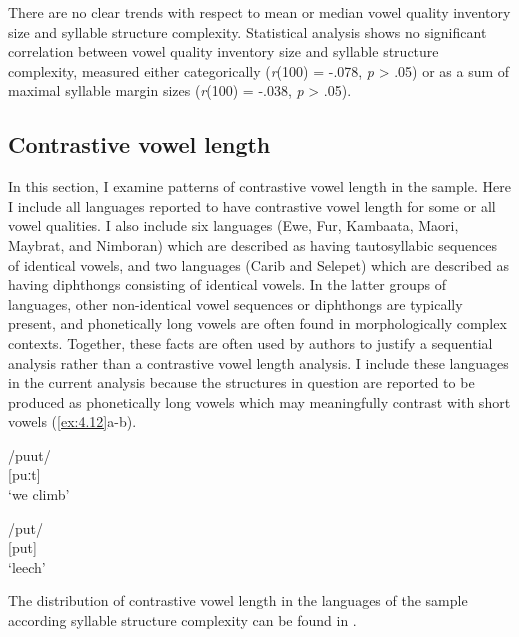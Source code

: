   There are no clear trends with respect to mean or median vowel quality inventory size and syllable structure complexity. Statistical analysis shows no significant correlation between vowel quality inventory size and syllable structure complexity, measured either categorically (\textit{r}(100) = -.078, \textit{p} > .05) or as a sum of maximal syllable margin sizes (\textit{r}(100) = -.038, \textit{p} > .05).

\subsection{Contrastive vowel length}\label{sec:4.3.2}

  In this section, I examine patterns of contrastive vowel length in the sample. Here I include all languages reported to have contrastive vowel length for some or all vowel qualities. I also include six languages (Ewe, Fur, Kambaata, Maori, Maybrat, and Nimboran) which are described as having tautosyllabic sequences of identical vowels, and two languages (Carib and Selepet) which are described as having diphthongs consisting of identical vowels. In the latter groups of languages, other non-identical vowel sequences or diphthongs are typically present, and phonetically long vowels are often found in morphologically complex contexts. Together, these facts are often used by authors to justify a sequential analysis rather than a contrastive vowel length analysis. I include these languages in the current analysis because the structures in question are reported to be produced as phonetically long vowels which may meaningfully contrast with short vowels (\ref{ex:4.12}a-b).

\ea\label{ex:4.12}

\ea  /puut/\\{}
  [puːt]\\
\glt  ‘we climb’

\ex  /put/\\{}
  [put]\\
\glt  ‘leech’
\citep[29]{Dol2007}
\z
\z

  The distribution of contrastive vowel length in the languages of the sample according syllable structure complexity can be found in .


